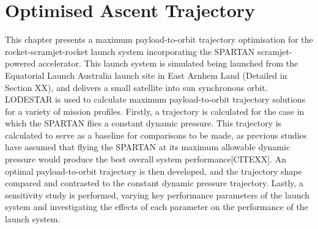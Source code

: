 
\cleardoublepage
\chapter{Optimised Ascent Trajectory}\label{chapter:Ascent}

This chapter presents a maximum payload-to-orbit trajectory optimisation for the rocket-scramjet-rocket launch system incorporating the SPARTAN scramjet-powered accelerator. 
This launch system is simulated being launched from the Equatorial Launch Australia launch site in East Arnhem Land (Detailed in Section XX), and delivers a small satellite into sun synchronous orbit. LODESTAR is used to calculate maximum payload-to-orbit trajectory solutions for a variety of mission profiles.
Firstly, a trajectory is calculated for the case in which the SPARTAN flies a constant dynamic pressure. This trajectory is calculated to serve as a baseline for comparisons to be made, as previous studies have assumed that flying the SPARTAN at its maximum allowable dynamic pressure would produce the best overall system performance[CITEXX]. An optimal payload-to-orbit trajectory is then developed, and the trajectory shape compared and contrasted to the constant dynamic pressure trajectory.
Lastly, a sensitivity study is performed, varying key performance parameters of the launch system and investigating the effects of each parameter on the performance of the launch system. 

